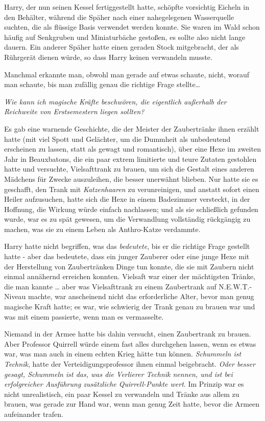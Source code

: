 {Harry, der nun seinen Kessel fertiggestellt hatte, schöpfte vorsichtig Eicheln in den Behälter, während die Späher nach einer nahegelegenen Wasserquelle suchten, die als flüssige Basis verwendet werden konnte. Sie waren im Wald schon häufig auf Senkgruben und Miniaturbäche gestoßen, es sollte also nicht lange dauern. Ein anderer Späher hatte einen geraden Stock mitgebracht, der als Rührgerät dienen würde, so dass Harry keinen verwandeln musste.

Manchmal erkannte man, obwohl man gerade auf etwas schaute, nicht, worauf man schaute, bis man zufällig genau die richtige Frage stellte…

\emph{Wie kann ich magische Kräfte beschwören, die eigentlich außerhalb der Reichweite von Erstsemestern liegen sollten?}

Es gab eine warnende Geschichte, die der Meister der Zaubertränke ihnen erzählt hatte (mit viel Spott und Gelächter, um die Dummheit als unbedeutend erscheinen zu lassen, statt als gewagt und romantisch), über eine Hexe im zweiten Jahr in Beauxbatons, die ein paar extrem limitierte und teure Zutaten gestohlen hatte und versuchte, Vielsafttrank zu brauen, um sich die Gestalt eines anderen Mädchens für Zwecke auszuleihen, die besser unerwähnt blieben. Nur hatte sie es geschafft, den Trank mit \emph{Katzenhaaren} zu verunreinigen, und anstatt sofort einen Heiler aufzusuchen, hatte sich die Hexe in einem Badezimmer versteckt, in der Hoffnung, die Wirkung würde einfach nachlassen; und als sie schließlich gefunden wurde, war es zu spät gewesen, um die Verwandlung vollständig rückgängig zu machen, was sie zu einem Leben als Anthro-Katze verdammte.

Harry hatte nicht begriffen, was das \emph{bedeutete}, bis er die richtige Frage gestellt hatte - aber das bedeutete, dass ein junger Zauberer oder eine junge Hexe mit der Herstellung von Zaubertränken Dinge tun konnte, die sie mit Zaubern nicht einmal annähernd erreichen konnten. Vielsaft war einer der mächtigsten Tränke, die man kannte … aber was Vielsafttrank zu einem Zaubertrank auf N.E.W.T.-Niveau machte, war anscheinend nicht das erforderliche Alter, bevor man genug magische Kraft hatte; es war, wie schwierig der Trank genau zu brauen war und was mit einem passierte, wenn man es vermasselte.

Niemand in der Armee hatte bis dahin versucht, einen Zaubertrank zu brauen. Aber Professor Quirrell würde einem fast alles durchgehen lassen, wenn es etwas war, was man auch in einem echten Krieg hätte tun können. \emph{Schummeln ist Technik}, hatte der Verteidigungsprofessor ihnen einmal beigebracht. \emph{Oder besser gesagt, Schummeln ist das, was die Verlierer Technik nennen, und ist bei erfolgreicher Ausführung zusätzliche Quirrell-Punkte wert}. Im Prinzip war es nicht unrealistisch, ein paar Kessel zu verwandeln und Tränke aus allem zu brauen, was gerade zur Hand war, wenn man genug Zeit hatte, bevor die Armeen aufeinander trafen.

}
